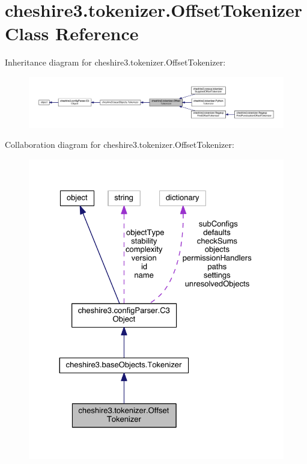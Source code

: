 \hypertarget{classcheshire3_1_1tokenizer_1_1_offset_tokenizer}{\section{cheshire3.\-tokenizer.\-Offset\-Tokenizer Class Reference}
\label{classcheshire3_1_1tokenizer_1_1_offset_tokenizer}
}


Inheritance diagram for cheshire3.\-tokenizer.\-Offset\-Tokenizer\-:
\nopagebreak
\begin{figure}[H]
\begin{center}
\leavevmode
\includegraphics[width=350pt]{classcheshire3_1_1tokenizer_1_1_offset_tokenizer__inherit__graph}
\end{center}
\end{figure}


Collaboration diagram for cheshire3.\-tokenizer.\-Offset\-Tokenizer\-:
\nopagebreak
\begin{figure}[H]
\begin{center}
\leavevmode
\includegraphics[width=326pt]{classcheshire3_1_1tokenizer_1_1_offset_tokenizer__coll__graph}
\end{center}
\end{figure}
